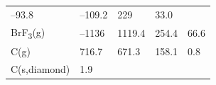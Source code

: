 \documentclass[
  9pt,
]{extbook}
\theoremstyle{definition}
\theoremstyle{definition}
\theoremstyle{definition}
\theoremstyle{remark}
\begin{document}
\begin{longtable}[]{@{}lllll@{}}
\begin{minipage}[t]{0.19\columnwidth}
--93.8\strut
\end{minipage} & \begin{minipage}[t]{0.20\columnwidth}\raggedright
--109.2\strut
\end{minipage} & \begin{minipage}[t]{0.18\columnwidth}\raggedright
229\strut
\end{minipage} & \begin{minipage}[t]{0.18\columnwidth}\raggedright
33.0\strut
\end{minipage}\tabularnewline
\begin{minipage}[t]{0.10\columnwidth}\raggedright
BrF\textsubscript{3}(g)\strut
\end{minipage} & \begin{minipage}[t]{0.19\columnwidth}\raggedright
--1136\strut
\end{minipage} & \begin{minipage}[t]{0.20\columnwidth}\raggedright
1119.4\strut
\end{minipage} & \begin{minipage}[t]{0.18\columnwidth}\raggedright
254.4\strut
\end{minipage} & \begin{minipage}[t]{0.18\columnwidth}\raggedright
66.6\strut
\end{minipage}\tabularnewline
\begin{minipage}[t]{0.10\columnwidth}\raggedright
C(g)\strut
\end{minipage} & \begin{minipage}[t]{0.19\columnwidth}\raggedright
716.7\strut
\end{minipage} & \begin{minipage}[t]{0.20\columnwidth}\raggedright
671.3\strut
\end{minipage} & \begin{minipage}[t]{0.18\columnwidth}\raggedright
158.1\strut
\end{minipage} & \begin{minipage}[t]{0.18\columnwidth}\raggedright
0.8\strut
\end{minipage}\tabularnewline
\begin{minipage}[t]{0.10\columnwidth}\raggedright
C(s,diamond)\strut
\end{minipage} & \begin{minipage}[t]{0.19\columnwidth}\raggedright
1.9\strut
\end{minipage} & \begin{minipage}[t]{0.20\columnwidth}\raggedright

\end{minipage}
\end{longtable}
\end{document}
